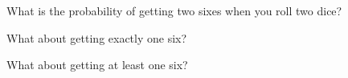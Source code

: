 \begin{myenum}
  \item What is the probability of getting two sixes when you roll two dice?
  \item What about getting exactly one six?
  \item What about getting at least one six?
\end{myenum}          
